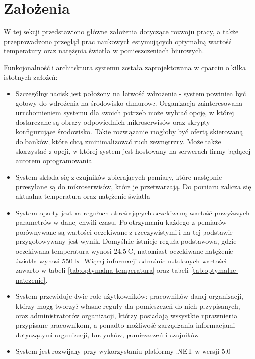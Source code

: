 \newpage
\section{Założenia}
W tej sekcji przedstawiono główne założenia dotyczące rozwoju pracy, a także
przeprowadzono przegląd prac naukowych estymujących optymalną wartość temperatury
oraz natężęnia światła w pomieszczeniach biurowych.

Funkcjonalność i architektura systemu została zaprojektowana w oparciu o kilka istotnych 
założeń:

\begin{itemize}
    \item Szczególny nacisk jest położony na łatwość wdrożenia - system powinien być 
    gotowy do wdrożenia na środowisko 
    chmurowe. Organizacja zainteresowana uruchomieniem systemu dla swoich potrzeb 
    może wybrać opcję, w której dostarczane są obrazy odpowiednich mikroserwisów oraz 
    skrypty konfigurujące środowisko. Takie rozwiązanie mogłoby być ofertą skierowaną 
    do banków, które chcą zminimalizować ruch zewnętrzny. Może także skorzystać z 
    opcji, w której system jest hostowany na serwerach firmy będącej autorem 
    oprogramowania
    \item System składa się z czujników zbierających pomiary, które następnie przesyłane 
    są do mikroserwisów, które je przetwarzają. Do pomiaru zalicza się aktualna 
    temperatura oraz natężenie światła
    \item System oparty jest na regułach określających oczekiwaną wartość powyższych 
    parametrów w danej chwili czasu. Po otrzymaniu każdego z pomiarów porównywane są 
    wartości oczekiwane z rzeczywistymi i na tej podstawie przygotowywany jest wynik. 
    Domyślnie istnieje reguła podstawowa, gdzie oczekiwana temperatura wynosi 24.5
    \degree C, natomiast oczekiwane natężenie światła wynosi 550 lx. 
    Więcej informacji odnośnie ustalonych wartości zawarto 
    w tabeli \ref{tab:optymalna-temperatura} oraz tabeli \ref{tab:optymalne-natezenie}.
    \item System przewiduje dwie role użytkowników: pracowników danej 
    organizacji, którzy mogą tworzyć własne reguły dla pomieszczeń do nich 
    przypisanych, oraz administratorów organizacji, którzy posiadają wszystkie 
    uprawnienia przypisane pracownikom, a ponadto możliwość zarządzania informacjami 
    dotyczącymi organizacji, budynków, pomieszczeń i czujników
    \item System jest rozwijany przy wykorzystaniu platformy .NET w wersji 5.0
\end{itemize}

